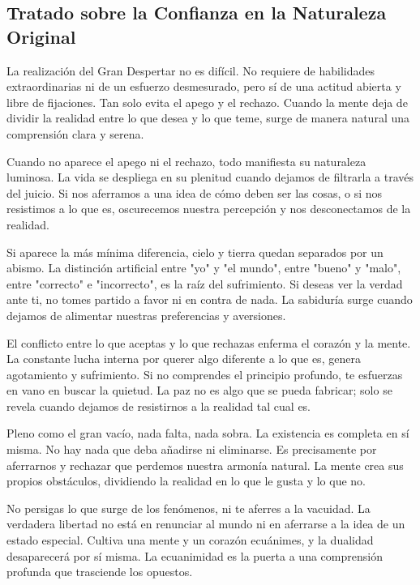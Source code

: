 \documentclass[
  a5paperpaper,
]{article}
\begin{document}
\hfill\break

\hypertarget{tratado-sobre-la-confianza-en-la-naturaleza-original}{%
\subsection{Tratado sobre la Confianza en la Naturaleza
Original}\label{tratado-sobre-la-confianza-en-la-naturaleza-original}}

\hfill\break

La realización del Gran Despertar no es difícil. No requiere de
habilidades extraordinarias ni de un esfuerzo desmesurado, pero sí de
una actitud abierta y libre de fijaciones. Tan solo evita el apego y el
rechazo. Cuando la mente deja de dividir la realidad entre lo que desea
y lo que teme, surge de manera natural una comprensión clara y serena.

Cuando no aparece el apego ni el rechazo, todo manifiesta su naturaleza
luminosa. La vida se despliega en su plenitud cuando dejamos de
filtrarla a través del juicio. Si nos aferramos a una idea de cómo deben
ser las cosas, o si nos resistimos a lo que es, oscurecemos nuestra
percepción y nos desconectamos de la realidad.

Si aparece la más mínima diferencia, cielo y tierra quedan separados por
un abismo. La distinción artificial entre "yo" y "el mundo", entre
"bueno" y "malo", entre "correcto" e "incorrecto", es la raíz del
sufrimiento. Si deseas ver la verdad ante ti, no tomes partido a favor
ni en contra de nada. La sabiduría surge cuando dejamos de alimentar
nuestras preferencias y aversiones.

El conflicto entre lo que aceptas y lo que rechazas enferma el corazón y
la mente. La constante lucha interna por querer algo diferente a lo que
es, genera agotamiento y sufrimiento. Si no comprendes el principio
profundo, te esfuerzas en vano en buscar la quietud. La paz no es algo
que se pueda fabricar; solo se revela cuando dejamos de resistirnos a la
realidad tal cual es.

Pleno como el gran vacío, nada falta, nada sobra. La existencia es
completa en sí misma. No hay nada que deba añadirse ni eliminarse. Es
precisamente por aferrarnos y rechazar que perdemos nuestra armonía
natural. La mente crea sus propios obstáculos, dividiendo la realidad en
lo que le gusta y lo que no.

No persigas lo que surge de los fenómenos, ni te aferres a la vacuidad.
La verdadera libertad no está en renunciar al mundo ni en aferrarse a la
idea de un estado especial. Cultiva una mente y un corazón ecuánimes, y
la dualidad desaparecerá por sí misma. La ecuanimidad es la puerta a una
comprensión profunda que trasciende los opuestos.
\end{document}
